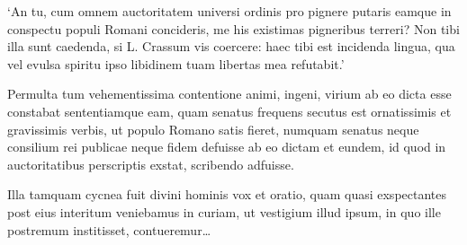 `An tu, cum omnem auctoritatem universi ordinis pro pignere putaris eamque in conspectu populi Romani concideris, me his existimas pigneribus terreri? Non tibi illa sunt caedenda, si L. Crassum vis coercere: haec tibi est incidenda lingua, qua vel evulsa spiritu ipso libidinem tuam libertas mea refutabit.' 

Permulta tum vehementissima contentione animi, ingeni, virium ab eo dicta esse constabat sententiamque eam, quam senatus frequens secutus est ornatissimis et gravissimis verbis, ut populo Romano satis fieret, numquam senatus neque consilium rei publicae neque fidem defuisse ab eo dictam et eundem, id quod in auctoritatibus perscriptis exstat, scribendo adfuisse. 

Illa tamquam cycnea fuit divini hominis vox et oratio, quam quasi exspectantes post eius interitum veniebamus in curiam, ut vestigium illud ipsum, in quo ille postremum institisset, contueremur\dots
